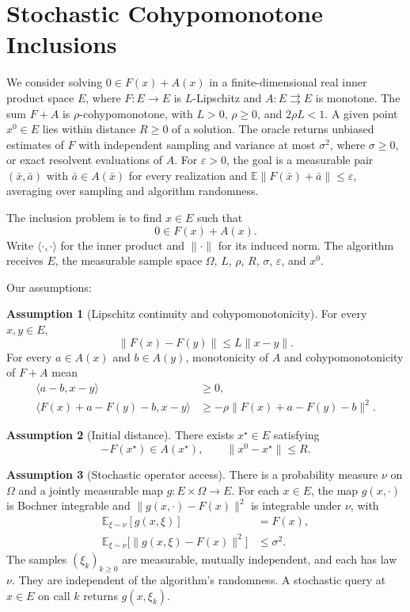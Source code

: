 \documentclass[10pt]{article}
\theoremstyle{definition}
\newtheorem{assumption}{Assumption}
\begin{document}
\section*{Stochastic Cohypomonotone Inclusions}
We consider solving $0\in F(x)+A(x)$ in a finite-dimensional real inner product space $E$, where $F:E\to E$ is $L$-Lipschitz and $A:E\rightrightarrows E$ is monotone. The sum $F+A$ is $\rho$-cohypomonotone, with $L>0$, $\rho\geq0$, and $2\rho L<1$. A given point $x^0\in E$ lies within distance $R\geq0$ of a solution. The oracle returns unbiased estimates of $F$ with independent sampling and variance at most $\sigma^2$, where $\sigma\geq0$, or exact resolvent evaluations of $A$. For $\varepsilon>0$, the goal is a measurable pair $(\bar{x},\bar{a})$ with $\bar{a}\in A(\bar{x})$ for every realization and $\mathbb{E}\|F(\bar{x})+\bar{a}\|\leq\varepsilon$, averaging over sampling and algorithm randomness.

The inclusion problem is to find $x\in E$ such that
\[
0\in F(x)+A(x).
\]
Write $\langle\cdot,\cdot\rangle$ for the inner product and $\|\cdot\|$ for its induced norm. The algorithm receives $E$, the measurable sample space $\Omega$, $L$, $\rho$, $R$, $\sigma$, $\varepsilon$, and $x^0$.

Our assumptions:
\begin{assumption}[Lipschitz continuity and cohypomonotonicity]
For every $x,y\in E$,
\[
\|F(x)-F(y)\|\leq L\|x-y\|.
\]
For every $a\in A(x)$ and $b\in A(y)$, monotonicity of $A$ and cohypomonotonicity of $F+A$ mean
\[
\begin{aligned}
\langle a-b,x-y\rangle&\geq0,\\
\langle F(x)+a-F(y)-b,x-y\rangle
&\geq-\rho\|F(x)+a-F(y)-b\|^2.
\end{aligned}
\]
\end{assumption}

\begin{assumption}[Initial distance]
There exists $x^\star\in E$ satisfying
\[
-F(x^\star)\in A(x^\star),
\qquad \|x^0-x^\star\|\leq R.
\]
\end{assumption}

\begin{assumption}[Stochastic operator access]
There is a probability measure $\nu$ on $\Omega$ and a jointly measurable map $g:E\times\Omega\to E$. For each $x\in E$, the map $g(x,\cdot)$ is Bochner integrable and $\|g(x,\cdot)-F(x)\|^2$ is integrable under $\nu$, with
\[
\begin{aligned}
\mathbb{E}_{\xi\sim\nu}[g(x,\xi)]&=F(x),\\
\mathbb{E}_{\xi\sim\nu}\bigl[\|g(x,\xi)-F(x)\|^2\bigr]&\leq\sigma^2.
\end{aligned}
\]
The samples $(\xi_k)_{k\geq0}$ are measurable, mutually independent, and each has law $\nu$. They are independent of the algorithm's randomness. A stochastic query at $x\in E$ on call $k$ returns $g(x,\xi_k)$.
\end{assumption}
\end{document}
